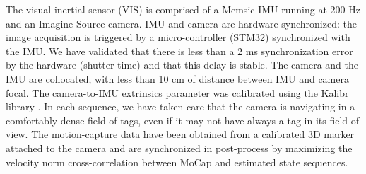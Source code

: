 The visual-inertial sensor (VIS) is comprised of a Memsic IMU running at 200 Hz and an Imagine Source camera.
IMU and camera are hardware synchronized: the image acquisition is triggered by a micro-controller (STM32) synchronized with the IMU.
We have validated that there is less than a 2 ms synchronization error by the hardware (shutter time) and that this delay is stable.
The camera and the IMU are collocated, with less than 10 cm of distance between IMU and camera focal. 
The camera-to-IMU extrinsics parameter was calibrated using the Kalibr library \cite{furgale2013unified}.
In each sequence, we have taken care that the camera is navigating in a comfortably-dense field of tags, even if it may not have always a tag in its field of view.
The motion-capture data have been obtained from a calibrated 3D marker attached to the camera and are synchronized in post-process by maximizing the velocity norm 
cross-correlation between MoCap and estimated state sequences.
%
